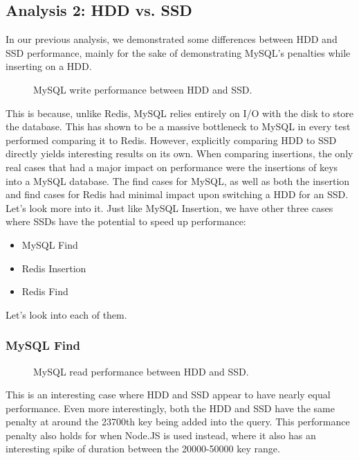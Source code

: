 \documentclass[letterpaper, 10 pt, conference]{ieeeconf}
\begin{document}
\subsection{Analysis 2: HDD vs. SSD}
In our previous analysis, we demonstrated some differences between HDD and SSD performance, mainly for the sake of demonstrating MySQL's penalties while inserting on a HDD.
\begin{figure}[h]
    \centering
    
    \caption{MySQL write performance between HDD and SSD.}
    \label{fig:mesh1}
\end{figure}
This is because, unlike Redis, MySQL relies entirely on I/O with the disk to store the database. This has shown to be a massive bottleneck to MySQL in every test performed comparing it to Redis. However, explicitly comparing HDD to SSD directly yields interesting results on its own. When comparing insertions, the only real cases that had a major impact on performance were the insertions of keys into a MySQL database. The find cases for MySQL, as well as both the insertion and find cases for Redis had minimal impact upon switching a HDD for an SSD. Let's look more into it.
Just like MySQL Insertion, we have other three cases where SSDs have the potential to speed up performance:
\begin{itemize}
    \item MySQL Find
    \item Redis Insertion
    \item Redis Find
\end{itemize}

Let's look into each of them.
\subsubsection{MySQL Find}
\begin{figure}[h]
    \centering
    
    \caption{MySQL read performance between HDD and SSD.}
    \label{fig:mesh1}
\end{figure}
This is an interesting case where HDD and SSD appear to have nearly equal performance. Even more interestingly, both the HDD and SSD have the same penalty at around the 23700th key being added into the query. This performance penalty also holds for when Node.JS is used instead, where it also has an interesting spike of duration between the 20000-50000 key range.
\end{document}
